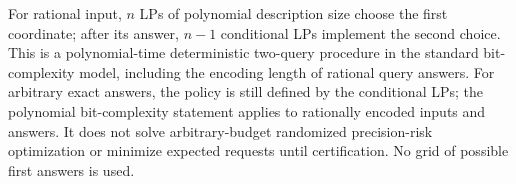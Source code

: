For rational input, $n$ LPs of polynomial description size choose the first
coordinate; after its answer, $n-1$ conditional LPs implement the second
choice. This is a polynomial-time deterministic two-query procedure in the
standard bit-complexity model, including the encoding length of rational
query answers. For arbitrary exact answers, the policy is still defined by
the conditional LPs; the polynomial bit-complexity statement applies to
rationally encoded inputs and answers. It does not solve arbitrary-budget
randomized precision-risk optimization or minimize expected requests until
certification. No grid of possible first answers is used.
